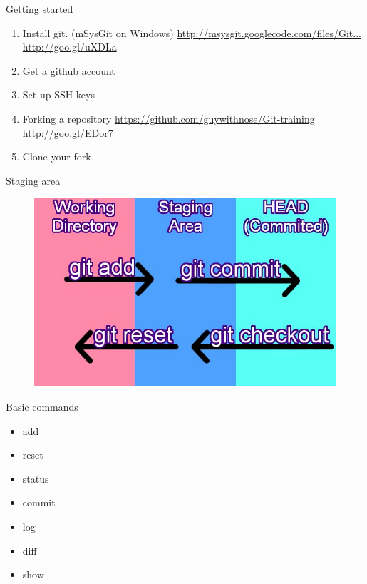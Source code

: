 \documentclass[14pt]{beamer}
\begin{document}
\begin{frame}{Getting started}
	\begin{enumerate}
		\small
		\item Install git. (mSysGit on Windows)\newline
		\href{http://msysgit.googlecode.com/files/Git-1.7.11-preview20120710.exe}{http://msysgit.googlecode.com/files/Git...}
		\href{http://goo.gl/uXDLa}{http://goo.gl/uXDLa}
		\item Get a github account
		\item Set up SSH keys
		\item Forking a repository\newline
		\href{https://github.com/guywithnose/Git-training}{https://github.com/guywithnose/Git-training}
		\href{http://goo.gl/EDor7}{http://goo.gl/EDor7}
		\item Clone your fork
	\end{enumerate}
\end{frame}

\begin{frame}{Staging area}
	\begin{figure}[htb]
		\centering
		\includegraphics[width=\textwidth]{commit-add-reset.jpg}
	\end{figure}
\end{frame}

\begin{frame}{Basic commands}
	\begin{itemize}
		\item add
		\item reset
		\item status
		\item commit
		\item log
		\item diff
		\item show
	\end{itemize}
\end{frame}
\end{document}
